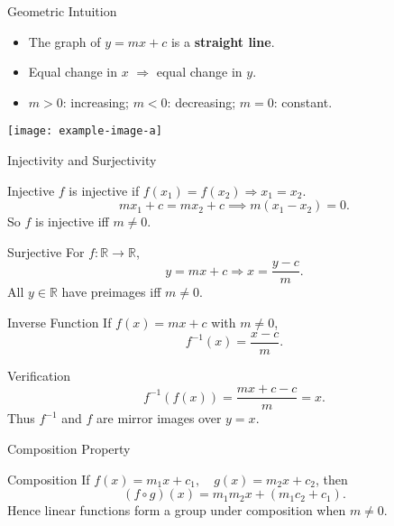 \documentclass[aspectratio=169,10pt]{beamer}
\begin{document}
\begin{frame}{Geometric Intuition}
\begin{itemize}
    \item The graph of \(y = mx + c\) is a \textbf{straight line}.
    \item Equal change in \(x\) $\Rightarrow$ equal change in \(y\).
    \item \(m>0\): increasing; \(m<0\): decreasing; \(m=0\): constant.
\end{itemize}

\pause
\begin{center}
\texttt{[image: example-image-a]}
\end{center}
\end{frame}

\begin{frame}{Injectivity and Surjectivity}
\begin{block}{Injective}
\(f\) is injective if \(f(x_1)=f(x_2)\Rightarrow x_1=x_2\).
\[
mx_1+c = mx_2+c \implies m(x_1-x_2)=0.
\]
So \(f\) is injective iff \(m\neq0\).
\end{block}
\pause
\begin{block}{Surjective}
For \(f:\mathbb{R}\to\mathbb{R}\),
\[
y=mx+c \Rightarrow x=\frac{y-c}{m}.
\]
All \(y\in\mathbb{R}\) have preimages iff \(m\neq0\).
\end{block}
\end{frame}

\begin{frame}{Inverse Function}
If \(f(x)=mx+c\) with \(m\neq0\),
\[
f^{-1}(x) = \frac{x-c}{m}.
\]

\pause
\begin{exampleblock}{Verification}
\[
f^{-1}(f(x)) = \frac{mx+c-c}{m}=x.
\]
Thus \(f^{-1}\) and \(f\) are mirror images over \(y=x\).
\end{exampleblock}
\end{frame}

\begin{frame}{Composition Property}
\begin{exampleblock}{Composition}
If \(f(x)=m_1x+c_1,\quad g(x)=m_2x+c_2\), then
\[
(f\circ g)(x)=m_1m_2x+(m_1c_2+c_1).
\]
Hence linear functions form a group under composition when \(m\neq0\).
\end{exampleblock}
\end{frame}
\end{document}

